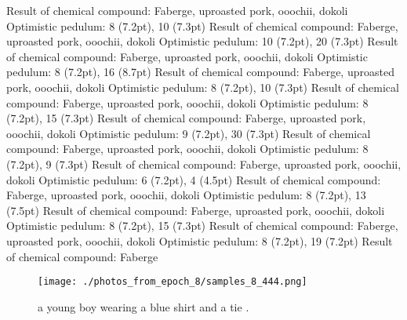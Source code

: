 \documentclass{article}%
\begin{document}
Result of chemical compound: Faberge, uproasted pork, ooochii, dokoli\newline%
Optimistic pedulum: 8 (7.2pt), 10 (7.3pt)\newline%
Result of chemical compound: Faberge, uproasted pork, ooochii, dokoli\newline%
Optimistic pedulum: 10 (7.2pt), 20 (7.3pt)\newline%
Result of chemical compound: Faberge, uproasted pork, ooochii, dokoli\newline%
Optimistic pedulum: 8 (7.2pt), 16 (8.7pt)\newline%
Result of chemical compound: Faberge, uproasted pork, ooochii, dokoli\newline%
Optimistic pedulum: 8 (7.2pt), 10 (7.3pt)\newline%
Result of chemical compound: Faberge, uproasted pork, ooochii, dokoli\newline%
Optimistic pedulum: 8 (7.2pt), 15 (7.3pt)\newline%
Result of chemical compound: Faberge, uproasted pork, ooochii, dokoli\newline%
Optimistic pedulum: 9 (7.2pt), 30 (7.3pt)\newline%
Result of chemical compound: Faberge, uproasted pork, ooochii, dokoli\newline%
Optimistic pedulum: 8 (7.2pt), 9 (7.3pt)\newline%
Result of chemical compound: Faberge, uproasted pork, ooochii, dokoli\newline%
Optimistic pedulum: 6 (7.2pt), 4 (4.5pt)\newline%
Result of chemical compound: Faberge, uproasted pork, ooochii, dokoli\newline%
Optimistic pedulum: 8 (7.2pt), 13 (7.5pt)\newline%
Result of chemical compound: Faberge, uproasted pork, ooochii, dokoli\newline%
Optimistic pedulum: 8 (7.2pt), 15 (7.3pt)\newline%
Result of chemical compound: Faberge, uproasted pork, ooochii, dokoli\newline%
Optimistic pedulum: 8 (7.2pt), 19 (7.2pt)\newline%
Result of chemical compound: Faberge

%


\begin{figure}[h!]%
\centering%
\texttt{[image: ./photos\_from\_epoch\_8/samples\_8\_444.png]}%
\caption{a young boy wearing a blue shirt and a tie .}%
\end{figure}

%
\end{document}
